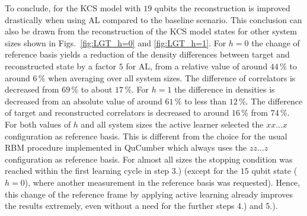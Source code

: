 \documentclass[pra,aps,showpacs,groupedaddress,superscriptaddress,twocolumn,toc=flat,biblatex,footinbib]{revtex4-1}
\begin{document}
To conclude, for the KCS model with $19$ qubits the reconstruction is improved drastically when using AL compared to the baseline scenario. This conclusion can also be drawn from the reconstruction of the KCS model states for other system sizes shown in Figs.~\ref{fig:LGT_h=0} and \ref{fig:LGT_h=1}. 
 For $h=0$ the change of reference basis yields a reduction of the density differences between target and reconstructed state by a factor $5$ for AL, from a relative value of around $44\,\%$ to around $6\,\%$ when averaging over all system sizes. The difference of correlators is decreased from $69\,\%$ to about $17\,\%$.  
For $h=1$ the difference in densities is decreased from an absolute value of around $61\,\%$ to less than $12\,\%$. The difference of target and reconstructed correlators is decreased to around $16\,\%$ from $74\,\%$. For both values of $h$ and all system sizes the active learner selected the $xx\dots x$ configuration as reference basis. This is different from the choice for the usual RBM procedure implemented in QuCumber which always uses the $zz\dots z$ configuration as reference basis. For almost all sizes the stopping condition was reached within the first learning cycle in step 3.)  (except for the $15$ qubit state ($h=0$), where another measurement in the reference basis was requested). Hence, this change of the reference frame by applying active learning already improves the results extremely, even without a need for the further steps 4.) and 5.).\\
\end{document}
